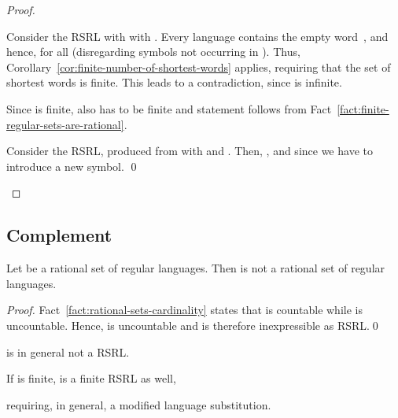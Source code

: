 \documentclass[envcountsame]{llncs}
\newcommand{\RegularlyGeneratedLanguageSet}{rational set of regular languages\xspace}
\newcommand{\RegularlyGeneratedLanguageSetAbbrev}{RSRL\xspace}
\begin{document}
\begin{proof}
  \begin{inparaenum}[\bfseries(1)]
  \item Consider the \RegularlyGeneratedLanguageSetAbbrev  with  with .
Every language  contains the
    empty word~, and hence,
     for all 
    (disregarding symbols  not occurring in ).
Thus, Corollary~\ref{cor:finite-number-of-shortest-words} applies,
    requiring that the set of shortest words
     is finite. 
This leads to a contradiction, since
     is infinite. 
\item Since  is finite, also
     has to be finite and statement follows
    from Fact~\ref{fact:finite-regular-sets-are-rational}.
\item Consider the \RegularlyGeneratedLanguageSetAbbrev , produced
    from  with  and
    .
Then, ,
    and since  we have to
    introduce a new symbol.  \qed
  \end{inparaenum}
\end{proof}




\subsection{Complement}
\label{sec:complement}


\begin{proposition}
  \label{prop:closure:complement}
  Let  be a \RegularlyGeneratedLanguageSet.  Then 
  is not a \RegularlyGeneratedLanguageSet.
\end{proposition}

\begin{proof}
  Fact~\ref{fact:rational-sets-cardinality} states that 
  is countable while  is uncountable.
Hence,  is uncountable and is
  therefore inexpressible as \RegularlyGeneratedLanguageSetAbbrev.\qed
\end{proof}



\begin{proposition}
  \label{prop:closure:pw-complement}
  \begin{inparaenum}
  \item\label{prop:closure:pw-complement:a}
     is in general not a \RegularlyGeneratedLanguageSetAbbrev.
  \item\label{prop:closure:pw-complement:b} If  is
    finite,  is a finite \RegularlyGeneratedLanguageSetAbbrev
    as well,
  \item requiring, in general, a modified language substitution.
  \end{inparaenum}
\end{proposition}
\end{document}
